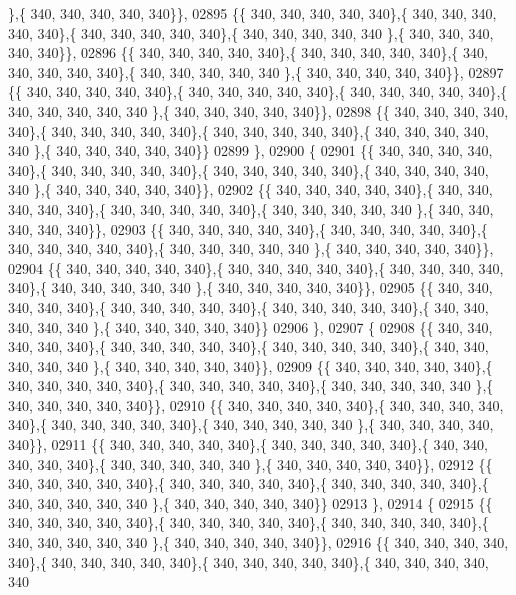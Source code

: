 \begin{DoxyCode}
      \},\{ 340, 340, 340, 340, 340\}\},
02895 \{\{ 340, 340, 340, 340, 340\},\{ 340, 340, 340, 340, 340\},\{ 340, 340, 340, 340, 340\},\{ 340, 340, 340, 340, 340
      \},\{ 340, 340, 340, 340, 340\}\},
02896 \{\{ 340, 340, 340, 340, 340\},\{ 340, 340, 340, 340, 340\},\{ 340, 340, 340, 340, 340\},\{ 340, 340, 340, 340, 340
      \},\{ 340, 340, 340, 340, 340\}\},
02897 \{\{ 340, 340, 340, 340, 340\},\{ 340, 340, 340, 340, 340\},\{ 340, 340, 340, 340, 340\},\{ 340, 340, 340, 340, 340
      \},\{ 340, 340, 340, 340, 340\}\},
02898 \{\{ 340, 340, 340, 340, 340\},\{ 340, 340, 340, 340, 340\},\{ 340, 340, 340, 340, 340\},\{ 340, 340, 340, 340, 340
      \},\{ 340, 340, 340, 340, 340\}\}
02899 \},
02900 \{
02901 \{\{ 340, 340, 340, 340, 340\},\{ 340, 340, 340, 340, 340\},\{ 340, 340, 340, 340, 340\},\{ 340, 340, 340, 340, 340
      \},\{ 340, 340, 340, 340, 340\}\},
02902 \{\{ 340, 340, 340, 340, 340\},\{ 340, 340, 340, 340, 340\},\{ 340, 340, 340, 340, 340\},\{ 340, 340, 340, 340, 340
      \},\{ 340, 340, 340, 340, 340\}\},
02903 \{\{ 340, 340, 340, 340, 340\},\{ 340, 340, 340, 340, 340\},\{ 340, 340, 340, 340, 340\},\{ 340, 340, 340, 340, 340
      \},\{ 340, 340, 340, 340, 340\}\},
02904 \{\{ 340, 340, 340, 340, 340\},\{ 340, 340, 340, 340, 340\},\{ 340, 340, 340, 340, 340\},\{ 340, 340, 340, 340, 340
      \},\{ 340, 340, 340, 340, 340\}\},
02905 \{\{ 340, 340, 340, 340, 340\},\{ 340, 340, 340, 340, 340\},\{ 340, 340, 340, 340, 340\},\{ 340, 340, 340, 340, 340
      \},\{ 340, 340, 340, 340, 340\}\}
02906 \},
02907 \{
02908 \{\{ 340, 340, 340, 340, 340\},\{ 340, 340, 340, 340, 340\},\{ 340, 340, 340, 340, 340\},\{ 340, 340, 340, 340, 340
      \},\{ 340, 340, 340, 340, 340\}\},
02909 \{\{ 340, 340, 340, 340, 340\},\{ 340, 340, 340, 340, 340\},\{ 340, 340, 340, 340, 340\},\{ 340, 340, 340, 340, 340
      \},\{ 340, 340, 340, 340, 340\}\},
02910 \{\{ 340, 340, 340, 340, 340\},\{ 340, 340, 340, 340, 340\},\{ 340, 340, 340, 340, 340\},\{ 340, 340, 340, 340, 340
      \},\{ 340, 340, 340, 340, 340\}\},
02911 \{\{ 340, 340, 340, 340, 340\},\{ 340, 340, 340, 340, 340\},\{ 340, 340, 340, 340, 340\},\{ 340, 340, 340, 340, 340
      \},\{ 340, 340, 340, 340, 340\}\},
02912 \{\{ 340, 340, 340, 340, 340\},\{ 340, 340, 340, 340, 340\},\{ 340, 340, 340, 340, 340\},\{ 340, 340, 340, 340, 340
      \},\{ 340, 340, 340, 340, 340\}\}
02913 \},
02914 \{
02915 \{\{ 340, 340, 340, 340, 340\},\{ 340, 340, 340, 340, 340\},\{ 340, 340, 340, 340, 340\},\{ 340, 340, 340, 340, 340
      \},\{ 340, 340, 340, 340, 340\}\},
02916 \{\{ 340, 340, 340, 340, 340\},\{ 340, 340, 340, 340, 340\},\{ 340, 340, 340, 340, 340\},\{ 340, 340, 340, 340, 340

\end{DoxyCode}
